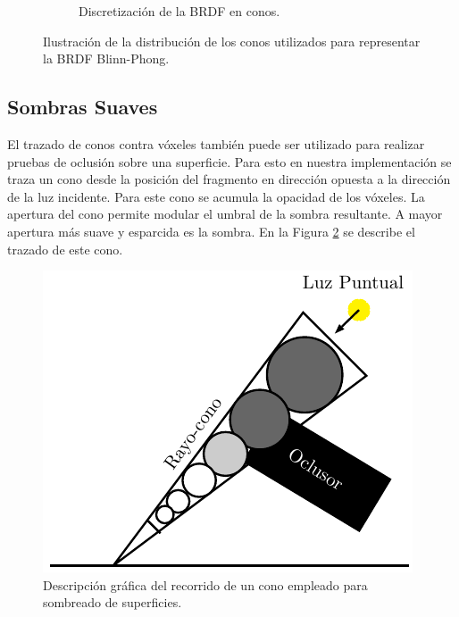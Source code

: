 \begin{figure}[H]
\begin{subfigure}[t]{.32\linewidth}
		\caption*{Discretización de la BRDF en conos.}
	\end{subfigure}%
	\caption{Ilustración de la distribución de los conos utilizados para representar la \ac{BRDF} Blinn-Phong.}
	\label{fig:brdf_cones2}
\end{figure}

\subsection{Sombras Suaves} %
\label{sub:sombras_suaves_con_trazado_de_conos}
El trazado de conos contra vóxeles también puede ser utilizado para realizar pruebas de oclusión sobre una superficie. Para esto en nuestra implementación se traza un cono desde la posición del fragmento en dirección opuesta a la dirección de la luz incidente. Para este cono se acumula la opacidad de los vóxeles. La apertura del cono permite modular el umbral de la sombra resultante. A mayor apertura más suave y esparcida es la sombra. En la Figura \ref{fig:shadow_cone_prop} se describe el trazado de este cono.

\begin{figure}[H]
	\centering
	\captionsetup{justification=centering}
	\includegraphics[width=.4\linewidth]{media/shadow_cone.pdf}
	\caption{Descripción gráfica del recorrido de un cono empleado para sombreado de superficies.}
	\label{fig:shadow_cone_prop}
\end{figure}

